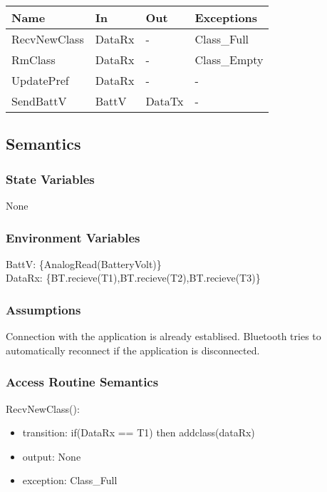 \documentclass[12pt, titlepage]{article}
\begin{document}
\begin{center}
\begin{tabular}{p{3cm} p{4cm} p{3cm} p{3cm}}
\hline
\textbf{Name} & \textbf{In} & \textbf{Out} & \textbf{Exceptions} \\
\hline
RecvNewClass & DataRx & - & Class\_Full \\
\hline
RmClass & DataRx & - & Class\_Empty \\
\hline
UpdatePref & DataRx & - & - \\
\hline
SendBattV & BattV & DataTx & - \\
\hline

\end{tabular}
\end{center}

\subsection{Semantics}

\subsubsection{State Variables}

None
\subsubsection{Environment Variables}

BattV: \{AnalogRead(BatteryVolt)\} \\
DataRx: \{BT.recieve(T1),BT.recieve(T2),BT.recieve(T3)\}

\subsubsection{Assumptions}

Connection with the application is already establised. Bluetooth tries to automatically reconnect if the application is disconnected. 

\subsubsection{Access Routine Semantics}

\noindent RecvNewClass():
\begin{itemize}
\item transition: if(DataRx == T1) then addclass(dataRx) 
\item output: None 
\item exception: Class\_Full
\end{itemize}
\end{document}
